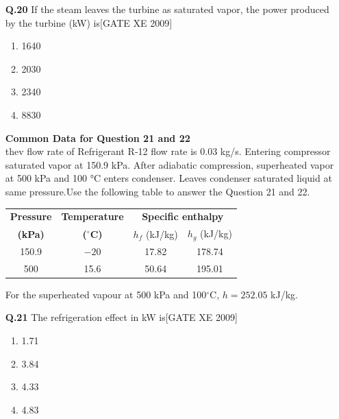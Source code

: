 \documentclass[journal,12pt,onecolumn]{IEEEtran}
\theoremstyle{remark}
\begin{document}
\begin{enumerate}
\vspace{0.3cm}

\item[\textbf{Q.20}] If the steam leaves the turbine as saturated vapor, the power produced by the turbine (kW) is\hfill[GATE XE 2009]
\begin{multicols}{2}
\begin{enumerate}
    \item 1640
    \item 2030
    \item 2340
    \item 8830
\end{enumerate}
\end{multicols}

\vspace{0.3cm}

\textbf{Common Data for Question 21 and 22}\\ thev flow rate of Refrigerant R-12 flow rate is 0.03 kg/s. Entering compressor saturated vapor at 150.9 kPa. After adiabatic compression, superheated vapor at 500 kPa and 100 °C enters condenser. Leaves condenser saturated liquid at same pressure.Use the following table to answer the Question 21 and 22.
\begin{table}[h!]
\centering
\begin{tabular}{|c|c|c|c|}
\hline
\textbf{Pressure} & \textbf{Temperature} & \multicolumn{2}{c|}{\textbf{Specific enthalpy}} \\ \cline{3-4} 
\textbf{(kPa)} & \textbf{($^\circ$C)} & $h_f$ (kJ/kg) & $h_g$ (kJ/kg) \\ \hline
150.9 & $-20$ & 17.82 & 178.74 \\ \hline
500 & 15.6 & 50.64 & 195.01 \\ \hline
\end{tabular}
\end{table}

\noindent
For the superheated vapour at 500 kPa and 100$^\circ$C, $h = 252.05$ kJ/kg.

\item[\textbf{Q.21}]The refrigeration effect in kW is\hfill[GATE XE 2009]
\begin{multicols}{2}
\begin{enumerate}
    \item 1.71
    \item 3.84
    \item 4.33
    \item 4.83
\end{enumerate}
\end{multicols}


\end{enumerate}
\end{document}
